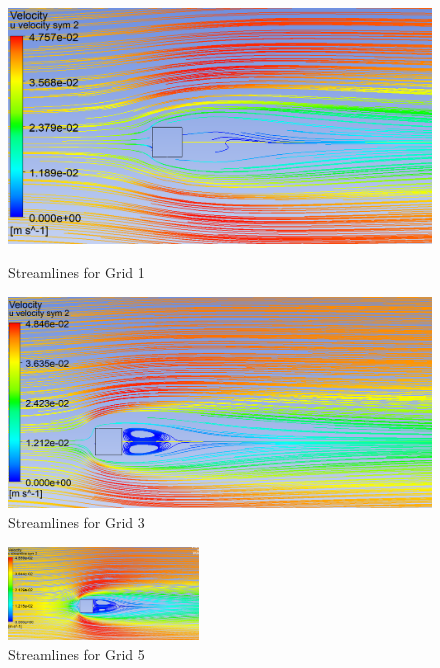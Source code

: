 \begin{figure}[H]
    \centering
    \begin{minipage}{0.45\textwidth}
        \centering
        \includegraphics[width=\textwidth]{Questions/Figures/u velocity streamline grid 1.png}
        \caption{Streamlines for Grid 1}
        \label{fig:streamlines_grid_1}
    \end{minipage}
    \begin{minipage}{0.45\textwidth}
        \centering
        \includegraphics[width=\textwidth]{Questions/Figures/u velocity streamline grid 3.png}
        \caption{Streamlines for Grid 3}
        \label{fig:streamlines_grid_3}
    \end{minipage}
\end{figure}
\begin{figure}[H]
    \centering
    \includegraphics[width=0.45\textwidth]{Questions/Figures/u velocity streamline grid 5.png}
    \caption{Streamlines for Grid 5}
    \label{fig:streamlines_grid_5}
\end{figure}

